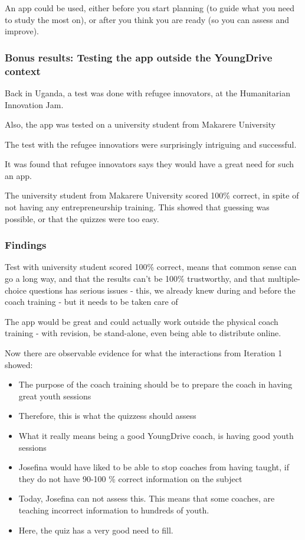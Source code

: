 An app could be used, either before you start planning (to guide what you need to study the most on), or after you think you are ready (so you can assess and improve).

\subsubsection{Bonus results: Testing the app outside the YoungDrive context}
Back in Uganda, a test was done with refugee innovators, at the Humanitarian Innovation Jam.

Also, the app was tested on a university student from Makarere University

The test with the refugee innovatiors were surprisingly intriguing and successful.

It was found that refugee innovators says they would have a great need for such an app.

The university student from Makarere University scored 100\% correct, in spite of not having any entrepreneurship training. This showed that guessing was possible, or that the quizzes were too easy.

\subsubsection{Findings}

Test with university student scored 100\% correct, means that common sense can go a long way, and that the results can't be 100\% trustworthy, and that multiple-choice questions has serious issues - this, we already knew during and before the coach training - but it needs to be taken care of

The app would be great and could actually work outside the physical coach training - with revision, be stand-alone, even being able to distribute online.

Now there are observable evidence for what the interactions from Iteration 1 showed:

\begin{itemize}
\item The purpose of the coach training should be to prepare the coach in having great youth sessions
\item Therefore, this is what the quizzess should assess
\item What it really means being a good YoungDrive coach, is having good youth sessions
\item Josefina would have liked to be able to stop coaches from having taught, if they do not have 90-100 \% correct information on the subject
\item Today, Josefina can not assess this. This means that some coaches, are teaching incorrect information to hundreds of youth.
\item Here, the quiz has a very good need to fill.
\end{itemize}

